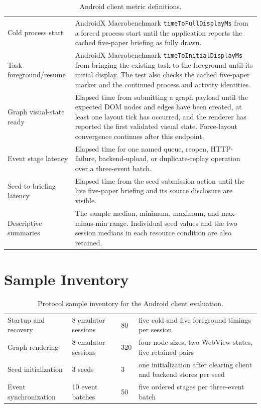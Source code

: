 \begin{longtable}{P{3.7cm}P{10.4cm}}
\caption{Android client metric definitions.}
\label{tab:android-metric-definitions}\\
\toprule
{} &  \\
\midrule
Cold process start &
AndroidX Macrobenchmark \texttt{timeToFullDisplayMs} from a forced process
start until the application reports the cached five-paper briefing as fully
drawn. \\
\addlinespace
Task foreground/resume &
AndroidX Macrobenchmark \texttt{timeToInitialDisplayMs} from bringing the
existing task to the foreground until its initial display. The test also
checks the cached five-paper marker and the continued process and activity
identities. \\
\addlinespace
Graph visual-state ready &
Elapsed time from submitting a graph payload until the expected DOM nodes and
edges have been created, at least one layout tick has occurred, and the
renderer has reported the first validated visual state. Force-layout
convergence continues after this endpoint. \\
\addlinespace
Event stage latency &
Elapsed time for one named queue, reopen, HTTP-failure, backend-upload, or
duplicate-replay operation over a three-event batch. \\
\addlinespace
Seed-to-briefing latency &
Elapsed time from the seed submission action until the live five-paper
briefing and its source disclosure are visible. \\
\addlinespace
Descriptive summaries &
The sample median, minimum, maximum, and max-minus-min range. Individual seed
values and the two session medians in each resource condition are also
retained. \\
\bottomrule
\end{longtable}

\section{Sample Inventory}

\begin{longtable}{P{4.2cm}P{2.2cm}P{2.9cm}P{3.1cm}}
\caption{Protocol sample inventory for the Android client evaluation.}
\label{tab:android-sample-inventory}\\
\toprule
{} &  &
 &  \\
\midrule
Startup and recovery & 8 emulator sessions & 80 & five cold and five
foreground timings per session \\
Graph rendering & 8 emulator sessions & 320 & four node sizes, two WebView
states, five retained pairs \\
Seed initialization & 3 seeds & 3 & one initialization after clearing client
and backend stores per seed \\
Event synchronization & 10 event batches & 50 & five ordered stages per
three-event batch \\
\bottomrule
\end{longtable}

